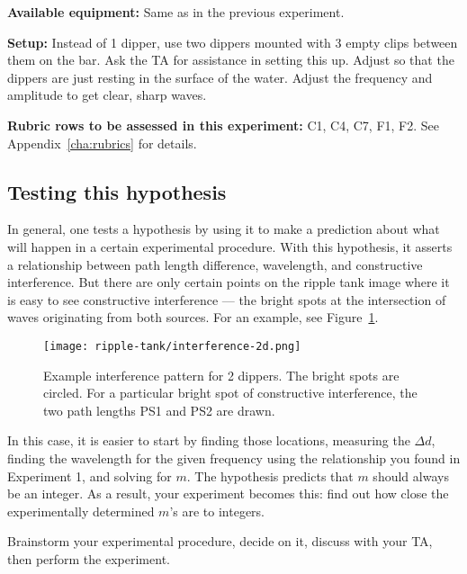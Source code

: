 \textbf{Available equipment:} Same as in the previous experiment.

\textbf{Setup:} Instead of 1 dipper, use two dippers mounted with 3 empty clips between them on the bar. Ask the TA for assistance in setting this up. Adjust so that the dippers are just resting in the surface of the water. Adjust the frequency and amplitude to get clear, sharp waves.

\textbf{Rubric rows to be assessed in this experiment:} C1, C4, C7, F1, F2. See Appendix~\ref{cha:rubrics} for details.

\subsection{Testing this hypothesis}

In general, one tests a hypothesis by using it to make a prediction about what will happen in a certain experimental procedure. With this hypothesis, it asserts a relationship between path length difference, wavelength, and constructive interference. But there are only certain points on the ripple tank image where it is easy to see constructive interference --- the bright spots at the intersection of waves originating from both sources. For an example, see Figure~\ref{rt:fig:interference-2d}.

\begin{figure}
	\centering
	\texttt{[image: ripple-tank/interference-2d.png]}
	\caption{Example interference pattern for 2 dippers. The bright spots are circled. For a particular bright spot of constructive interference, the two path lengths PS1 and PS2 are drawn.}\label{rt:fig:interference-2d}
\end{figure}

In this case, it is easier to start by finding those locations, measuring the $\Delta d$, finding the wavelength for the given frequency using the relationship you found in Experiment 1, and solving for $m$. The hypothesis predicts that $m$ should always be an integer. As a result, your experiment becomes this: find out how close the experimentally determined $m$'s are to integers.

Brainstorm your experimental procedure, decide on it, discuss with your TA, then perform the experiment.

